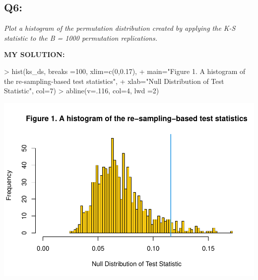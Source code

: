 \documentclass[
]{article}
\newenvironment{Shaded}{\begin{snugshade}}{\end{snugshade}}
\newcommand{\AttributeTok}[1]{\textcolor[rgb]{0.77,0.63,0.00}{#1}}
\newcommand{\DecValTok}[1]{\textcolor[rgb]{0.00,0.00,0.81}{#1}}
\newcommand{\FloatTok}[1]{\textcolor[rgb]{0.00,0.00,0.81}{#1}}
\newcommand{\FunctionTok}[1]{\textcolor[rgb]{0.00,0.00,0.00}{#1}}
\newcommand{\NormalTok}[1]{#1}
\newcommand{\SpecialCharTok}[1]{\textcolor[rgb]{0.00,0.00,0.00}{#1}}
\newcommand{\StringTok}[1]{\textcolor[rgb]{0.31,0.60,0.02}{#1}}
\begin{document}
\hypertarget{q6}{%
\subsection{Q6:}\label{q6}}

\emph{Plot a histogram of the permutation distribution created by
applying the K-S statistic to the B = 1000 permutation replications.}

\textbf{MY SOLUTION:}

\begin{Shaded}
\begin{Highlighting}[]
\SpecialCharTok{\textgreater{}} \FunctionTok{hist}\NormalTok{(ks\_ds, }\AttributeTok{breaks =}\DecValTok{100}\NormalTok{, }\AttributeTok{xlim=}\FunctionTok{c}\NormalTok{(}\DecValTok{0}\NormalTok{,}\FloatTok{0.17}\NormalTok{), }
\SpecialCharTok{+}      \AttributeTok{main=}\StringTok{"Figure 1. A histogram of the re{-}sampling{-}based test statistics"}\NormalTok{,}
\SpecialCharTok{+}      \AttributeTok{xlab=}\StringTok{"Null Distribution of Test Statistic"}\NormalTok{, }\AttributeTok{col=}\DecValTok{7}\NormalTok{)}
\SpecialCharTok{\textgreater{}} \FunctionTok{abline}\NormalTok{(}\AttributeTok{v=}\NormalTok{.}\DecValTok{116}\NormalTok{, }\AttributeTok{col=}\DecValTok{4}\NormalTok{, }\AttributeTok{lwd =}\DecValTok{2}\NormalTok{)}
\end{Highlighting}
\end{Shaded}

\includegraphics{Homework_07_Pan_files/figure-latex/unnamed-chunk-6-1.pdf}
\end{document}

